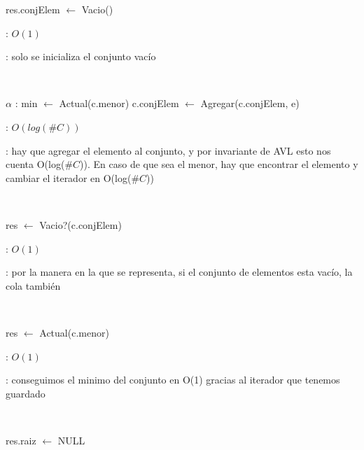 \begin{Algoritmos}

	\begin{algorithm}[H]
		\NoCaptionOfAlgo
		\caption{}
		res.conjElem $\leftarrow$ Vacio()
	\end{algorithm}

	\complejidad: $O(1)$

	\justifcomp: solo se inicializa el conjunto vacío

	~

	\begin{algorithm}[H]
		\NoCaptionOfAlgo
		\caption{}
		$\alpha$ : min $\leftarrow$ Actual(c.menor)
		c.conjElem $\leftarrow$ Agregar(c.conjElem, e)
	\end{algorithm}

	\complejidad: $O(log(\#C))$

	\justifcomp: hay que agregar el elemento al conjunto, y por invariante de AVL esto nos cuenta O(log($\#C$)). En caso de que sea el menor, hay que encontrar el elemento y cambiar el iterador en O(log($\#C$))

	~

	\begin{algorithm}[H]
		\NoCaptionOfAlgo
		\caption{}
		res $\leftarrow$ Vacio?(c.conjElem)
	\end{algorithm}

	\complejidad: $O(1)$

	\justifcomp: por la manera en la que se representa, si el conjunto de elementos esta vacío, la cola también

	~

	\begin{algorithm}[H]
		\NoCaptionOfAlgo
		\caption{}
		res $\leftarrow$ Actual(c.menor)
	\end{algorithm}

	\complejidad: $O(1)$

	\justifcomp: conseguimos el minimo del conjunto en O(1) gracias al iterador que tenemos guardado

	~

	\begin{algorithm}[H]
		\NoCaptionOfAlgo
		\caption{}
		res.raiz $\leftarrow$ NULL
	\end{algorithm}


\end{Algoritmos}
